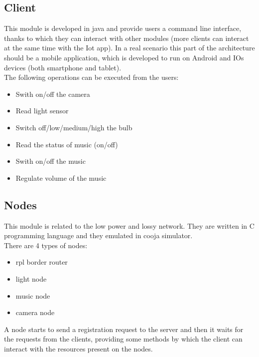 \documentclass[a4paper]{article}
\begin{document}
\subsection{Client}
This module is developed in java and provide users a command line interface, thanks to which they can interact with other modules (more clients can interact at the same time with the Iot app). In a real scenario this part of the architecture should be a mobile application, which is developed to run on Android and IOs devices (both smartphone and tablet).\\
The following operations can be executed from the users:
\begin{itemize}
\item Swith on/off the camera
\item Read light sensor
\item Switch off/low/medium/high the bulb
\item Read the status of music (on/off)
\item Swith on/off the music
\item Regulate volume of the music
\end{itemize}

\subsection{Nodes}
This module is related to the low power and lossy network. They are written in C programming language and they emulated in cooja simulator. \\
There are 4 types of nodes:
\begin{itemize}
\item rpl border router
\item light node
\item music node
\item camera node
\end{itemize}
A node starts to send a registration request to the server and then it waits for the requests from the clients, providing some methods by which the client can interact with the resources present on the nodes.
\end{document}
